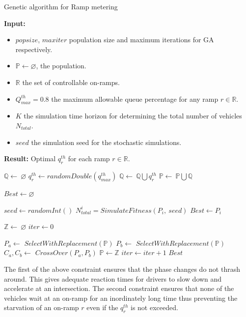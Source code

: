 \documentclass{wscpaperproc}
\theoremstyle{wsc}
\begin{document}
\begin{algorithm}[!b]
\caption{Genetic algorithm for Ramp metering}
\label{algo:ramp-metering}
{\bf Input: }
\begin{itemize}
\item $popsize$, $maxiter$ population size and maximum iterations for GA respectively.
\item $\mathbb{P}\leftarrow \varnothing$, the population.
\item $\mathbb{R}$ the set of controllable on-ramps.
\item $Q^{th}_{max}=0.8$ the maximum allowable queue percentage for any ramp $r\in \mathbb{R}$.
\item $K$ the simulation time horizon for determining the total number of vehicles $N_{total}$.
\item $seed$ the simulation seed for the stochastic simulations.
\end{itemize}
{\bf Result: }Optimal $q_r^{th}$ for each ramp $r \in \mathbb{R}$.
\begin{algorithmic}[1]

	\State $\mathbb{Q}\leftarrow~\varnothing$
	\State $q_r^{th} \leftarrow randomDouble(q^{th}_{max})$
	\State $\mathbb{Q}\leftarrow~\mathbb{Q} \bigcup q_r^{th}$
	\EndFor
	\State $\mathbb{P} \leftarrow~\mathbb{P}\bigcup \mathbb{Q}$
\EndFor	

\State $Best\leftarrow\varnothing$

\Repeat

$seed\leftarrow randomInt()$
\State  $N^i_{total}=SimulateFitness(P_i,~seed)$
\State $Best\leftarrow P_i$
\EndIf
\EndFor

\State$\mathbb{Z}\leftarrow~\varnothing$
\State $iter\leftarrow0$

	 $P_a\leftarrow$ $SelectWithReplacement(\mathbb{P})$
	 $P_b\leftarrow$ $SelectWithReplacement(\mathbb{P})$
	 $C_a, C_b\leftarrow$ $CrossOver(P_a,P_b)$
\EndFor
\State $\mathbb{P}\leftarrow\mathbb{Z}$
\State $iter\leftarrow iter+1$
\State \Return $Best$
\end{algorithmic}
\end{algorithm}

The first of the above constraint ensures that the phase changes do not thrash around. This gives adequate reaction times for drivers to slow down and accelerate at an intersection. The second constraint ensures that none of the vehicles wait at an on-ramp for an inordinately long time thus preventing the starvation of an on-ramp $r$ even if the $q^{th}_r$ is not exceeded.
\end{document}
